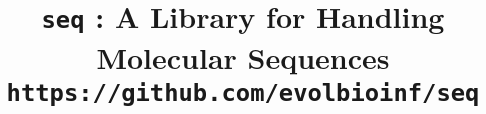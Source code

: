 

\pagestyle{noweb}

\title{\texttt{seq} : A Library for Handling Molecular
Sequences\\
\small\texttt{https://github.com/evolbioinf/seq}}
\author{}

\date{}
\maketitle




